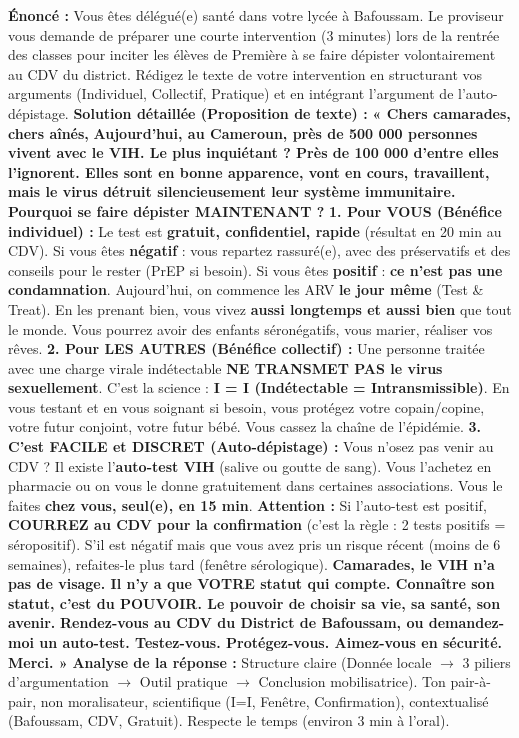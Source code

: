 \documentclass[11pt]{article}
\begin{document}
\begin{exoresolu}
\textbf{Énoncé :} Vous êtes délégué(e) santé dans votre lycée à Bafoussam. Le proviseur vous demande de préparer une courte intervention (3 minutes) lors de la rentrée des classes pour inciter les élèves de Première à se faire dépister volontairement au CDV du district. Rédigez le texte de votre intervention en structurant vos arguments (Individuel, Collectif, Pratique) et en intégrant l'argument de l'auto-dépistage.
\tcblower
\textbf{Solution détaillée (Proposition de texte) :}
\textbf{« Chers camarades, chers aînés,}
\textbf{Aujourd'hui, au Cameroun, près de 500 000 personnes vivent avec le VIH. Le plus inquiétant ? \textbf{Près de 100 000 d'entre elles l'ignorent.} Elles sont en bonne apparence, vont en cours, travaillent, mais le virus détruit silencieusement leur système immunitaire.}
\textbf{Pourquoi se faire dépister MAINTENANT ?}
\textbf{1. Pour VOUS (Bénéfice individuel) :} Le test est \textbf{gratuit, confidentiel, rapide} (résultat en 20 min au CDV). Si vous êtes \textbf{négatif} : vous repartez rassuré(e), avec des préservatifs et des conseils pour le rester (PrEP si besoin). Si vous êtes \textbf{positif} : \textbf{ce n'est pas une condamnation}. Aujourd'hui, on commence les ARV \textbf{le jour même} (Test \& Treat). En les prenant bien, vous vivez \textbf{aussi longtemps et aussi bien} que tout le monde. Vous pourrez avoir des enfants séronégatifs, vous marier, réaliser vos rêves.
\textbf{2. Pour LES AUTRES (Bénéfice collectif) :} Une personne traitée avec une charge virale indétectable \textbf{NE TRANSMET PAS le virus sexuellement}. C'est la science : \textbf{I = I (Indétectable = Intransmissible)}. En vous testant et en vous soignant si besoin, vous protégez votre copain/copine, votre futur conjoint, votre futur bébé. Vous cassez la chaîne de l'épidémie.
\textbf{3. C'est FACILE et DISCRET (Auto-dépistage) :} Vous n'osez pas venir au CDV ? Il existe l'\textbf{auto-test VIH} (salive ou goutte de sang). Vous l'achetez en pharmacie ou on vous le donne gratuitement dans certaines associations. Vous le faites \textbf{chez vous, seul(e), en 15 min}. \textbf{Attention :} Si l'auto-test est positif, \textbf{COURREZ au CDV pour la confirmation} (c'est la règle : 2 tests positifs = séropositif). S'il est négatif mais que vous avez pris un risque récent (moins de 6 semaines), refaites-le plus tard (fenêtre sérologique).
\textbf{Camarades, le VIH n'a pas de visage. Il n'y a que VOTRE statut qui compte. Connaître son statut, c'est du POUVOIR. Le pouvoir de choisir sa vie, sa santé, son avenir.}
\textbf{Rendez-vous au CDV du District de Bafoussam, ou demandez-moi un auto-test. \textbf{Testez-vous. Protégez-vous. Aimez-vous en sécurité.} Merci. »}
\textbf{Analyse de la réponse :} Structure claire (Donnée locale $\rightarrow$ 3 piliers d'argumentation $\rightarrow$ Outil pratique $\rightarrow$ Conclusion mobilisatrice). Ton pair-à-pair, non moralisateur, scientifique (I=I, Fenêtre, Confirmation), contextualisé (Bafoussam, CDV, Gratuit). Respecte le temps (environ 3 min à l'oral).
\end{exoresolu}
\end{document}
